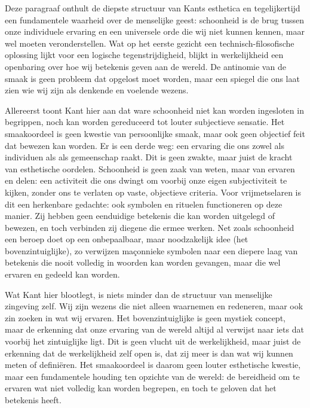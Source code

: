 \begin{mdframed}[leftmargin=0pt,rightmargin=0pt,backgroundcolor=blue!6,linecolor=white,innertopmargin=6pt,innerbottommargin=6pt]
\bigskip
Deze paragraaf onthult de diepste structuur van Kants esthetica en tegelijkertijd een fundamentele waarheid over de menselijke geest: schoonheid is de brug tussen onze individuele ervaring en een universele orde die wij niet kunnen kennen, maar wel moeten veronderstellen. Wat op het eerste gezicht een technisch-filosofische oplossing lijkt voor een logische tegenstrijdigheid, blijkt in werkelijkheid een openbaring over hoe wij betekenis geven aan de wereld. De antinomie van de smaak is geen probleem dat opgelost moet worden, maar een spiegel die ons laat zien wie wij zijn als denkende en voelende wezens.

Allereerst toont Kant hier aan dat ware schoonheid niet kan worden ingesloten in begrippen, noch kan worden gereduceerd tot louter subjectieve sensatie. Het smaakoordeel is geen kwestie van persoonlijke smaak, maar ook geen objectief feit dat bewezen kan worden. Er is een derde weg: een ervaring die ons zowel als individuen als als gemeenschap raakt. Dit is geen zwakte, maar juist de kracht van esthetische oordelen. Schoonheid is geen zaak van weten, maar van ervaren en delen: een activiteit die ons dwingt om voorbij onze eigen subjectiviteit te kijken, zonder ons te verlaten op vaste, objectieve criteria. Voor vrijmetselaren is dit een herkenbare gedachte: ook symbolen en rituelen functioneren op deze manier. Zij hebben geen eenduidige betekenis die kan worden uitgelegd of bewezen, en toch verbinden zij diegene die ermee werken. Net zoals schoonheid een beroep doet op een onbepaalbaar, maar noodzakelijk idee (het bovenzintuiglijke), zo verwijzen maçonnieke symbolen naar een diepere laag van betekenis die nooit volledig in woorden kan worden gevangen, maar die wel ervaren en gedeeld kan worden.

Wat Kant hier blootlegt, is niets minder dan de structuur van menselijke zingeving zelf. Wij zijn wezens die niet alleen waarnemen en redeneren, maar ook zin zoeken in wat wij ervaren. Het bovenzintuiglijke is geen mystiek concept, maar de erkenning dat onze ervaring van de wereld altijd al verwijst naar iets dat voorbij het zintuiglijke ligt. Dit is geen vlucht uit de werkelijkheid, maar juist de erkenning dat de werkelijkheid zelf open is, dat zij meer is dan wat wij kunnen meten of definiëren. Het smaakoordeel is daarom geen louter esthetische kwestie, maar een fundamentele houding ten opzichte van de wereld: de bereidheid om te ervaren wat niet volledig kan worden begrepen, en toch te geloven dat het betekenis heeft.


\end{mdframed}
